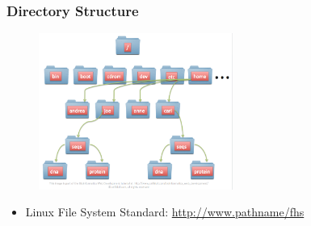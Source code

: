 \documentclass[red]{beamer}
\begin{document}
\begin{CJK*}{UTF8}{gbsn}
\begin{frame}
\frametitle{Directory Structure}
\begin{figure}
    \includegraphics[width=2.5in]{images/directory.png}
\end{figure}
\begin{itemize}
    \item Linux File System Standard: \url{http://www.pathname/fhs}
\end{itemize}
\end{frame}

\end{CJK*}
\end{document}
